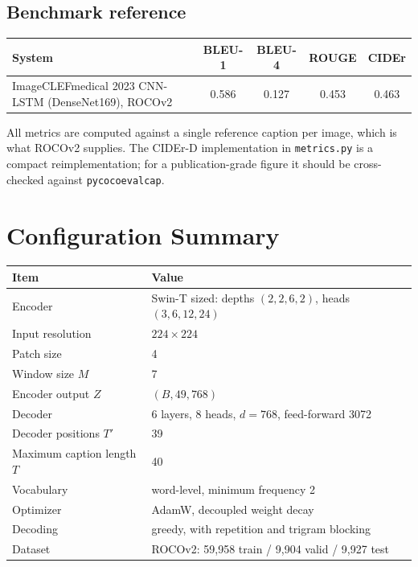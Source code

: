 \documentclass[12pt]{article}
\newcommand{\code}[1]{\texttt{#1}}
\begin{document}
\subsection{Benchmark reference}

\begin{center}
\begin{tabular}{@{}L{5.5cm}cccc@{}}
\toprule
System & BLEU-1 & BLEU-4 & ROUGE & CIDEr \\
\midrule
ImageCLEFmedical 2023 CNN-LSTM (DenseNet169), ROCOv2 & 0.586 & 0.127 & 0.453 & 0.463 \\
\bottomrule
\end{tabular}
\end{center}

All metrics are computed against a single reference caption per image, which is what ROCOv2 supplies. The CIDEr-D implementation in \code{metrics.py} is a compact reimplementation; for a publication-grade figure it should be cross-checked against \code{pycocoevalcap}.

\section{Configuration Summary}

\begin{center}
\begin{tabular}{@{}lL{7.5cm}@{}}
\toprule
Item & Value \\
\midrule
Encoder & Swin-T sized: depths $(2,2,6,2)$, heads $(3,6,12,24)$ \\
Input resolution & $224\times224$ \\
Patch size & 4 \\
Window size $M$ & 7 \\
Encoder output $Z$ & $(B, 49, 768)$ \\
Decoder & 6 layers, 8 heads, $d=768$, feed-forward 3072 \\
Decoder positions $T'$ & 39 \\
Maximum caption length $T$ & 40 \\
Vocabulary & word-level, minimum frequency 2 \\
Optimizer & AdamW, decoupled weight decay \\
Decoding & greedy, with repetition and trigram blocking \\
Dataset & ROCOv2: 59,958 train / 9,904 valid / 9,927 test \\
\bottomrule
\end{tabular}
\end{center}
\end{document}
